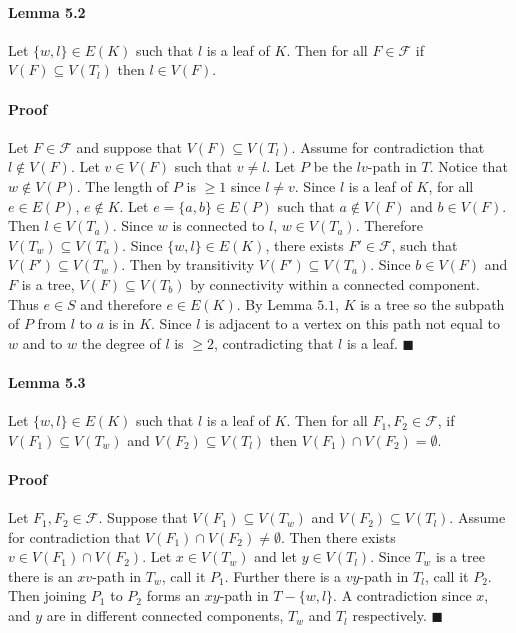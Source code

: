 \documentclass[letterpaper,12pt,oneside,onecolumn]{report}
\begin{document}
\paragraph{Lemma 5.2}
Let $\{w, l\} \in E(K)$ such that $l$ is a leaf of $K$. Then for all $F \in \mathcal{F}$ if $V(F) \subseteq V(T_l)$ then $l \in V(F)$.
\paragraph{Proof}
Let $F \in \mathcal{F}$ and suppose that $V(F) \subseteq V(T_l)$. Assume for contradiction that $l \not\in V(F)$. Let $v \in V(F)$ such that $v \neq l$. Let $P$ be the $lv$-path in $T$. Notice that $w \not\in V(P)$. The length of $P$ is $\geq 1$ since $l \neq v$. Since $l$ is a leaf of $K$, for all $e \in E(P)$, $e \not\in K$. Let $e = \{a,b\} \in E(P)$ such that $a \not\in V(F)$ and $b \in V(F)$. Then $l \in V(T_a)$. Since $w$ is connected to $l$, $w \in V(T_a)$. Therefore $V(T_w) \subseteq V(T_a)$. Since $\{w, l\} \in E(K)$, there exists $F' \in \mathcal{F}$, such that $V(F') \subseteq V(T_w)$. Then by transitivity $V(F') \subseteq V(T_a)$. Since $b \in V(F)$ and $F$ is a tree, $V(F) \subseteq V(T_b)$ by connectivity within a connected component. Thus $e \in S$ and therefore $e \in E(K)$. By Lemma $5.1$, $K$ is a tree so the subpath of $P$ from $l$ to $a$ is in $K$. Since $l$ is adjacent to a vertex on this path not equal to $w$ and to $w$ the degree of $l$ is $\geq 2$, contradicting that $l$ is a leaf. $\blacksquare$
\paragraph{Lemma 5.3}
Let $\{w,l\} \in E(K)$ such that $l$ is a leaf of $K$. Then for all $F_1, F_2 \in \mathcal{F}$, if $V(F_1) \subseteq V(T_w)$ and $V(F_2) \subseteq V(T_l)$ then $V(F_1) \cap V(F_2) = \emptyset$.
\paragraph{Proof}
Let $F_1, F_2 \in \mathcal{F}$. Suppose that $V(F_1) \subseteq V(T_w)$ and $V(F_2) \subseteq V(T_l)$. Assume for contradiction that $V(F_1) \cap V(F_2) \neq \emptyset$. Then there exists $v \in V(F_1) \cap V(F_2)$. Let $x \in V(T_w)$ and let $y \in V(T_l)$. Since $T_w$ is a tree there is an $xv$-path in $T_w$, call it $P_1$. Further there is a $vy$-path in $T_l$, call it $P_2$. Then joining $P_1$ to $P_2$ forms an $xy$-path in $T - \{w,l\}$. A contradiction since $x$, and $y$ are in different connected components, $T_w$ and $T_l$ respectively. $\blacksquare$
\end{document}
